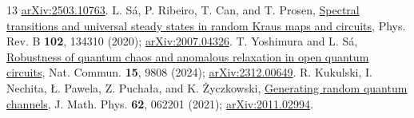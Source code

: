 \documentclass[aps,prb,onecolumn,nofootinbib,superscriptaddress,floatfix]{revtex4-2}
\begin{document}
\begin{thebibliography}{13}
\href{https://arxiv.org/abs/2503.10763}{arXiv:2503.10763}.
 L. S\'a, P. Ribeiro, T. Can, and T. Prosen,
\href{https://doi.org/10.1103/PhysRevB.102.134310}{Spectral transitions and
universal steady states in random Kraus maps and circuits},
Phys. Rev. B \textbf{102}, 134310 (2020);
\href{https://arxiv.org/abs/2007.04326}{arXiv:2007.04326}.
 T. Yoshimura and L. S\'a,
\href{https://www.nature.com/articles/s41467-024-54164-7}{Robustness of
quantum chaos and anomalous relaxation in open quantum circuits},
Nat. Commun. \textbf{15}, 9808 (2024);
\href{https://arxiv.org/abs/2312.00649}{arXiv:2312.00649}.
 R. Kukulski, I. Nechita, \L{}. Pawela, Z. Pucha\l{}a,
and K. \.{Z}yczkowski,
\href{https://doi.org/10.1063/5.0038838}{Generating random quantum channels},
J. Math. Phys. \textbf{62}, 062201 (2021);
\href{https://arxiv.org/abs/2011.02994}{arXiv:2011.02994}.
\end{thebibliography}
\end{document}
